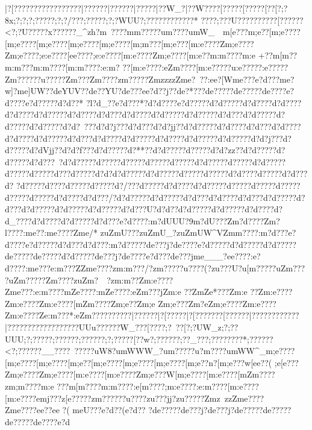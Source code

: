 {{{{{{{{{{{{{{{{{{{{{{{{{  |?[?????{?\???????{?????|?{?????|?{?????|?{????|?{?W_?|?{?W???{?[???? {?[????{?[??[?;?^^xx;?;?  ;?;?????;?;?/???;?????;?;?WUU?;???????? ????*
????;???U??????????[??????<?;?U}?????x??????}_^zh?}{m~????m{m?????u{m????u{mW_~~{m[e???{m;e??[m;e????[m;e????[m;e????[m;e????[m;e????[m;m???[m;e???[m:e????Zm;e????Zm;e????;e:e????[ee????;e:e????[m:e????Zm;e????[m:e??{m:m????{m:e
+??{m[m??{m:m???{m:m????[m:m????:e:m?
??[m:e????:eZm????[m:e?????u:e?????}:e?????}Zm?????}?u?????}Zm???}Zm????}zm?????}ZmzzzzZme?~??:ee?[Wme???e?d???me?w]?me]UW??deYUV??de??YU?de???ee?d??j??de?*???de?????de?????de????e?d????e?d?????d?d??*
?l?d_??}e?d???*?d?d????e?d?????d?d?????d?d????d?d????d?d????d?d?????d?d????d?d???d?d????d?d?????d?d?????d?d???d?d?????d?d?????d?d?????d?d?~???d?d?j???d?d???d?d?jj??d?d?????d?d????d?d???d?d????d?d????d?d?????d?d???d?d????d?d?????d?d????d?d?????d?d?????d?d?j???d?d?????d?dVjj??d?d?f???d?d?????d?\?**??d?d?????d?\?????d?d?zz??d?d?????d?d?????d?d???~?d?d?????d?\?????d?\?????d?\?????d?\?????d?d?????d?\?????d?d?????d?\?????d?\?????d?\???d?\?????d?d    ?d?d?????d?d?????d?\?????d?\?????d?d????d?\?????d?d???d?\ ?d?\?????d?\????d?\?????d?\?????d?\?/???d?\?????d?d????d?d?????d?\?????d?\?????d?\?????d?\?????d?\?????d?d????d?d???/?d?d?????d?d?????d?d???d?d????d?d???d?d?????d?d???d?d?????d?d?????d?d?????d?d???U?d?d?  ?d?d?????d?d?????d?d??}??d?d_????d?d????d?d?????d?d???e?d????:m?dUUU?9m?dU???Zm?d????Zm?l????:me??:me????Zme/*
zuZmU???zuZmU_?zuZmUW^VZmm????:m?d???e?d????e?d?????d?d???d?d???:m?d?????de???j?de????e?d?????d?d?????d?d?????de?????de?????d?d?????de???j?de????e?d???de???jme___?ee????:e?d????:me???e:m???ZZme????zm:m???/?}zm?????u?}???(?}zu???U?u[m?????uZm????uZm?????}Zm????zuZm?~~?zm:m??Zm:e????Zme???:e:m????mZe????:mZe????:eZm???jZm:e
??ZmZe*???Zm:e  ??Zm:e????Zm:e????Zm:e????[mZm????Zm;e ??Zm;e 
Zm;e ???Zm?e   Zm;e????Zm:e????Zm:e????Ze:m???*:eZm????{?{?????|?{?????|?[?????|?[???????[?????{?|???????{?????|?{?????{???????{?{?    ??{?UUu?{?{?    ??{?W_??{?[???{?;?~??[?;?UW_z;?;??UUU;?;?????;??????;??????;?;?????[??w?;??????;??_???;????????* ;??????<?;?????\??__????~?????uW^^x?u{mWWW_?u{m?????u?m??? ?u{mWW^_{m;e????[m;e????[m;e????[m;e??[m;e????[m;e????[m;e????[m;e??n?[m;e???w[ee??(
;e[e???Zm;e????Zm;e????[m:e????[m:e????Zm;e???W[m;e????[m:e????[mZm????zm;m????{m:e
???{m[m????{m:m????:e[m????;m:e????:e:m????[m:e????[m:e????e{mj???z}[e?????}zm?????}?u????zu?}??jj?}zu?????}Zmz~zzZme????Zme????ee? ? ee ?( meU???e?d??( e?d??
?de?????de???j?de???j?de?????de?????de?????de????e?d
}}}}}}}}}}}}}}}}}}}}}}}}}}}}}}}}}}}}}}}}}}}}}}}
